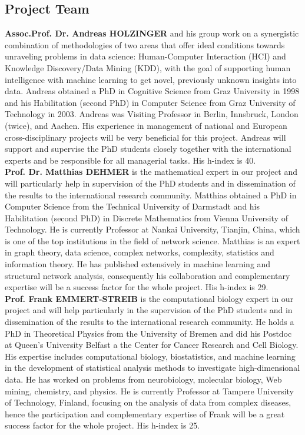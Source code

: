 \documentclass[a4paper,11pt]{article}
\begin{document}
\subsection{Project Team}

\textbf{Assoc.Prof. Dr. Andreas HOLZINGER} and his group work on a synergistic combination of methodologies of two areas that offer ideal conditions towards unraveling problems in data science: Human-Computer Interaction (HCI) and Knowledge Discovery/Data Mining (KDD), with the goal of supporting human intelligence with machine learning to get novel, previously unknown insights into data. Andreas obtained a PhD in Cognitive Science from Graz University in 1998 and his Habilitation (second PhD) in Computer Science from Graz University of Technology in 2003. Andreas was Visiting Professor in Berlin, Innsbruck, London (twice), and Aachen. His experience in management of national and European cross-disciplinary projects will be very beneficial for this project. Andreas will support and supervise the PhD students closely together with the international experts and be responsible for all managerial tasks. His h-index is 40.
\\[0,2cm]
\textbf{Prof. Dr. Matthias DEHMER} is the mathematical expert in our project and will particularly help in supervision of the PhD students and in dissemination of the results to the international research community. Matthias obtained a PhD in Computer Science from the Technical University of Darmstadt and his Habilitation (second PhD) in Discrete Mathematics from Vienna University of Technology. He is currently Professor at Nankai University, Tianjin, China, which is one of the top institutions in the field of network science. Matthias is an expert in graph theory, data science, complex networks, complexity, statistics and information theory. He has published extensively in machine learning and structural network analysis, consequently his collaboration and complementary expertise will be a success factor for the whole project. His h-index is 29.  
\\[0,2cm]
\textbf{Prof. Frank EMMERT-STREIB} is the computational biology expert in our project and will help particularly in the supervision of the PhD students and in dissemination of the results to the international research community. He holds a PhD in Theoretical Physics from the University of Bremen and did his Postdoc at Queen's University Belfast a the Center for Cancer Research and Cell Biology. His expertise includes computational biology, biostatistics, and machine learning in the development of statistical analysis methods to investigate high-dimensional data. He has worked on problems from neurobiology, molecular biology, Web mining, chemistry, and physics. He is currently Professor at Tampere University of Technology, Finland, focusing on the analysis of data from complex diseases, hence the participation and complementary expertise of Frank will be a great success factor for the whole project. His h-index is 25.
\end{document}
